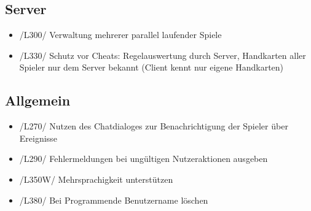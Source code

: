 \documentclass{article}
\begin{document}
\subsection{\gls{Server}}
\begin{itemize}
\item /L300/ Verwaltung mehrerer parallel laufender Spiele
\item /L330/ Schutz vor Cheats: Regelauswertung durch Server, Handkarten aller Spieler nur dem \gls{Server} bekannt 
		(\gls{Client} kennt nur eigene Handkarten)
\end{itemize}
	
\subsection{Allgemein}
\begin{itemize}
	\item /L270/ Nutzen des Chatdialoges zur Benachrichtigung der Spieler über Ereignisse
	\item /L290/ Fehlermeldungen bei ungültigen Nutzeraktionen ausgeben
	\item /L350W/ Mehrsprachigkeit unterstützen
	\item /L380/ Bei Programmende Benutzername löschen
\end{itemize}
	
\end{document}
